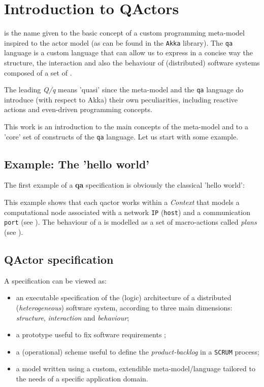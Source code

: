 \section{Introduction to QActors}

\qa{} is the name given to the basic concept of a custom programming meta-model inspired to the actor model (as can be found in the \texttt{Akka} library). The \texttt{qa} language is a custom language that can allow us to express in a concise way the structure, the interaction and also the behaviour of (distributed) software systems composed of a set of \qa{}.

The leading \textit{Q/q} means 'quasi' since the \qa{} meta-model and the \texttt{qa} language do introduce (with respect to Akka) their own peculiarities, including reactive actions and even-driven programming concepts.

This work is an introduction to the main concepts of the \qa{} meta-model and to a 'core' set of constructs of the \texttt{qa} language. Let us start with some example.

\subsection{Example: The 'hello world'}
The first example of a \textbf{qa} specification is obviously the classical 'hello world':



This example shows that each qactor works within a \textit{Context} that models a computational node associated with a network \texttt{IP} (\texttt{host}) and a communication \texttt{port} (see ). The behaviour of a is modelled as a set of macro-actions called \textit{plans} (see ).

\subsection{QActor specification}

A  \qa{} specification can be viewed as:
\begin{itemize}
\item an executable specification of the (logic) architecture of a distributed (\textit{heterogeneous}) software system, according to three main dimensions: \textit{structure}, \textit{interaction} and \textit{behaviour};
\item a prototype useful to fix software requirements ;
\item a (operational) scheme useful to define the \textit{product-backlog} in a \texttt{SCRUM} process;
\item a model written using a custom, extendible meta-model/language tailored to the needs of a specific application domain.
\end{itemize}

